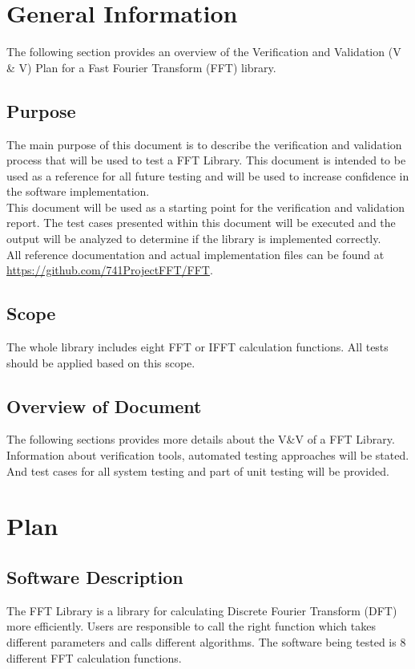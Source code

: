 \documentclass[12pt, titlepage]{article}
\begin{document}
\section{General Information}
The following section provides an overview of the Verification and
Validation (V \& V) Plan for a Fast Fourier Transform (FFT) library. 

\subsection{Purpose}
The main purpose of this document is to describe the verification and
validation process that will be used to test a FFT Library. This
 document is intended to be used as a reference for
all future testing and will be used
to increase confidence in the software implementation.\\
This document will be used as a starting point for the verification
and validation report.  The test cases presented within this document
will be executed and the output will be analyzed to determine if the
library is implemented correctly.\\
All reference documentation and actual implementation files can be found at  \url {https://github.com/741ProjectFFT/FFT}.

\subsection{Scope}
The whole library includes eight FFT or IFFT calculation functions. All tests should be applied based on this scope.

\subsection{Overview of Document}
The following sections provides more details about the V\&V of a FFT Library. Information about verification tools, automated testing approaches will be stated. And
test cases for all system testing and part of unit testing will be provided.
\section{Plan}
	
\subsection{Software Description}
The FFT Library is a library for calculating Discrete Fourier Transform (DFT) more efficiently. Users are responsible to call the right function which takes different parameters and calls
different algorithms.
The software being tested is 8 different FFT calculation functions.
\end{document}
